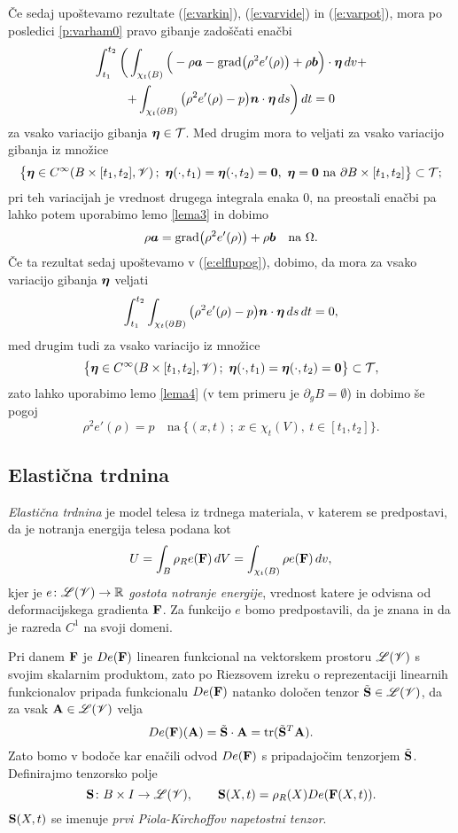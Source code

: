 Če sedaj upoštevamo rezultate (\ref{e:varkin}), (\ref{e:varvide}) in (\ref{e:varpot}),
mora po posledici \ref{p:varham0} pravo gibanje zadoščati enačbi
\begin{multline} \label{e:elflupog}
	\int_{t_1}^{t_2}\bigg( \int_{\chi_t(B)}\Big(-\rho\boldsymbol a-
	\mathrm{grad}\big(\rho^2 e'(\rho)\big)+\rho\boldsymbol b\Big)\cdot\boldsymbol \eta\,dv+ \\
	+\int_{\chi_t(\partial B)}\big(\rho^2 e'(\rho)-p\big)\boldsymbol n\cdot\boldsymbol \eta\,ds\bigg)\,dt=0
\end{multline}
za vsako variacijo gibanja $\boldsymbol \eta\in\mathcal{T}$. Med drugim mora to veljati za
vsako variacijo gibanja iz množice
\[
	\big\{ \boldsymbol \eta\in C^{\infty}(B\times[t_1,t_2],\mathscr V)\,;\ \boldsymbol \eta(\cdot,t_1)=
	\boldsymbol \eta(\cdot,t_2)=\boldsymbol 0,\ \boldsymbol \eta=\boldsymbol 0\ \textrm{na}\ \partial B\times[t_1,t_2]
	\big\}\subset\mathcal{T};
\]
pri teh variacijah je vrednost drugega integrala enaka 0, na preostali enačbi
pa lahko potem uporabimo lemo \ref{lema3} in dobimo
\begin{equation*}
	\rho\boldsymbol a=\mathrm{grad}\big(\rho^2 e'(\rho)\big)+\rho\boldsymbol b\quad
	\textrm{na}\ \Omega.
\end{equation*}
Če ta rezultat sedaj upoštevamo v (\ref{e:elflupog}), dobimo, da mora
za vsako variacijo gibanja $\boldsymbol \eta$ veljati
\[
	\int_{t_1}^{t_2}\int_{\chi_t(\partial B)}\big(\rho^2 e'(\rho)-p\big)\boldsymbol n\cdot\boldsymbol \eta\,ds\,dt=0,
\]
med drugim tudi za vsako variacijo iz množice
\[
	\big\{ \boldsymbol \eta\in C^{\infty}(B\times[t_1,t_2],\mathscr V)\,;\ \boldsymbol \eta(\cdot,t_1)=
	\boldsymbol \eta(\cdot,t_2)=\boldsymbol 0 \big\}\subset\mathcal{T},
\]
zato lahko uporabimo lemo \ref{lema4} (v tem primeru je $\partial_gB=\emptyset$) in dobimo še pogoj
\[
	\rho^2 e'(\rho)=p \quad\textrm{na}\ \{ (x,t)\,;\ x\in\chi_t(V),\ t\in[t_1,t_2] \}.
\]


\subsection{Elastična trdnina}


\emph{Elastična trdnina} je model telesa iz trdnega materiala, v katerem se predpostavi,
da je notranja energija telesa podana kot
\[ U=\int_{B}\rho_R e(\mathbf F)\,dV=\int_{\chi_t(B)}\rho e(\mathbf F)\,dv, \]
kjer je $e\colon\mathscr L(\mathscr V)\to\mathbb R$ \emph{gostota notranje energije}, vrednost katere je odvisna od
deformacijskega gradienta $\mathbf F$. Za funkcijo $e$ bomo predpostavili, da je znana in da je
razreda $C^1$ na svoji domeni.

Pri danem $\mathbf F$ je $De(\mathbf F)$ linearen funkcional
na vektorskem prostoru $\mathscr L(\mathscr V)$ s svojim skalarnim produktom, zato po Riezsovem izreku
o reprezentaciji linearnih funkcionalov pripada funkcionalu $De(\mathbf F)$ natanko
določen tenzor $\tilde{\mathbf S}\in\mathscr L(\mathscr V)$, da za vsak $\mathbf A\in\mathscr L(\mathscr V)$ velja
\[ De(\mathbf F)(\mathbf A)=\tilde{\mathbf S}\cdot\mathbf A=\mathrm{tr}(\tilde{\mathbf S}^{T}\mathbf A). \]
Zato bomo v bodoče kar enačili odvod $De(\mathbf F)$ s pripadajočim tenzorjem $\tilde{\mathbf S}$.
Definirajmo tenzorsko polje
\[
	\ten{S}\colon B\times I\to\L(\V),\qquad
	\ten{S}(X,t)=\rho_R(X)De(\ten{F}(X,t)).%
\]
$\mathbf S(X,t)$ se imenuje \emph{prvi Piola-Kirchoffov napetostni tenzor}.

